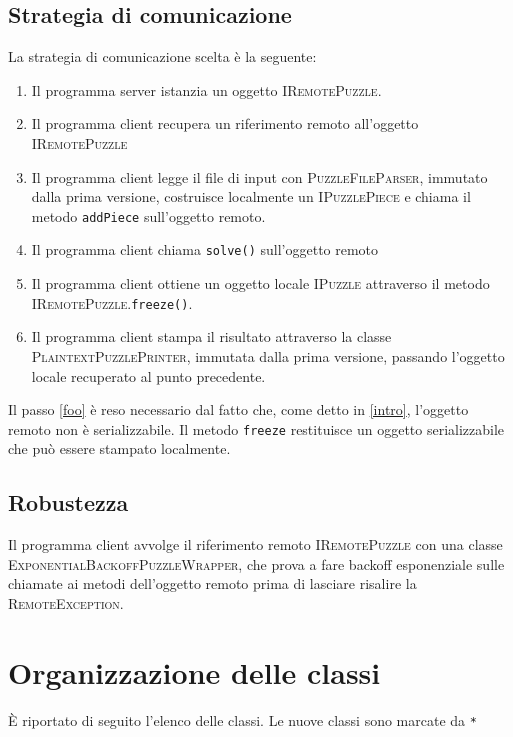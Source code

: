 \documentclass[a4paper]{article}
\newcommand{\Classname}[1]{\textsc{#1}}
\newcommand{\Ifacename}[1]{\textsc{#1}}
\newcommand{\Methodname}[1]{\texttt{#1}}
\begin{document}
\subsection{Strategia di comunicazione}
La strategia di comunicazione scelta \`e la seguente:
\begin{enumerate}
\item Il programma server istanzia un oggetto \Ifacename{IRemotePuzzle}.
\item Il programma client recupera un riferimento remoto all'oggetto \Ifacename{IRemotePuzzle}
\item Il programma client legge il file di input con \Classname{PuzzleFileParser}, immutato dalla prima versione, costruisce localmente un \Ifacename{IPuzzlePiece} e chiama il metodo \Methodname{addPiece} sull'oggetto remoto.
\item Il programma client chiama \Methodname{solve()} sull'oggetto remoto
\item \label{foo} Il programma client ottiene un oggetto locale \Ifacename{IPuzzle} attraverso il metodo \Ifacename{IRemotePuzzle}.\Methodname{freeze()}.
\item Il programma client stampa il risultato attraverso la classe \Classname{PlaintextPuzzlePrinter}, immutata dalla prima versione, passando l'oggetto locale recuperato al punto precedente.
\end{enumerate}

Il passo \ref{foo} \`e reso necessario dal fatto che, come detto in \ref{intro}, l'oggetto remoto non \`e serializzabile.
Il metodo \Methodname{freeze} restituisce un oggetto serializzabile che pu\`o essere stampato localmente.

\subsection{Robustezza}
Il programma client avvolge il riferimento remoto \Ifacename{IRemotePuzzle} con una classe \Classname{ExponentialBackoffPuzzleWrapper}, che prova a fare backoff esponenziale sulle chiamate ai metodi dell'oggetto remoto prima di lasciare risalire la \Classname{RemoteException}.

\section{Organizzazione delle classi}

\`E riportato di seguito l'elenco delle classi.
Le nuove classi sono marcate da \texttt{*}
\end{document}

